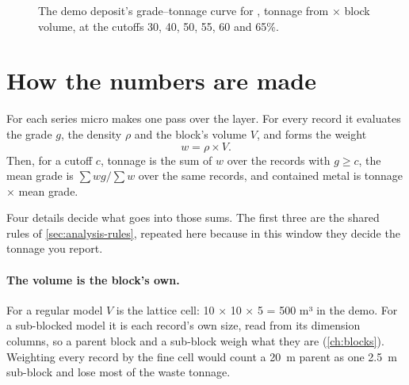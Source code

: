 \begin{figure}[htbp]\centering
{}
\caption{The demo deposit's grade–tonnage curve for , tonnage from  × block volume, at the cutoffs 30, 40, 50, 55, 60 and 65\%.}\label{fig:gt-demo}
\end{figure}

\section{How the numbers are made}\label{sec:gt-method}
For each series micro makes one pass over the layer. For every record it evaluates the grade $g$, the density $\rho$ and the block's volume $V$, and forms the weight
\[ w = \rho \times V . \]
Then, for a cutoff $c$, tonnage is the sum of $w$ over the records with $g \ge c$, the mean grade is $\sum w g / \sum w$ over the same records, and contained metal is tonnage × mean grade.

Four details decide what goes into those sums. The first three are the shared rules of \cref{sec:analysis-rules}, repeated here because in this window they decide the tonnage you report.

\paragraph{The volume is the block's own.} For a regular model $V$ is the lattice cell: 10 × 10 × 5 = 500 m³ in the demo. For a sub-blocked model it is each record's own size, read from its dimension columns, so a parent block and a sub-block weigh what they are (\cref{ch:blocks}). Weighting every record by the fine cell would count a 20~m parent as one 2.5~m sub-block and lose most of the waste tonnage.

